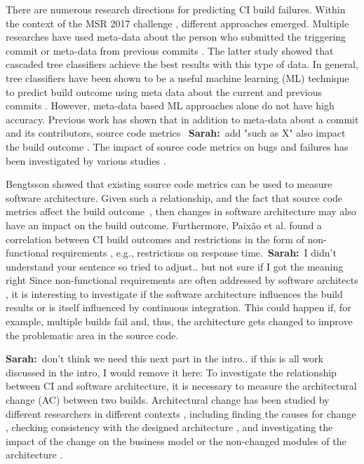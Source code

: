 \documentclass[sigplan, anonymous, review]{acmart}
\newcommand{\sn}[1]{{\color{blue}\textbf{Sarah:}~#1}}
\begin{document}
There are numerous research directions for predicting CI build failures. Within the context of the MSR 2017 challenge \cite{TravisTorrent}, different approaches emerged.
Multiple researches have used meta-data about the person who submitted the triggering commit \cite{ContrInvolv} or meta-data from previous commits \cite{Pred-Cascade}. The latter study showed that cascaded tree classifiers achieve the best results with this type of data. 
In general, tree classifiers have been shown to be a useful machine learning (ML) technique to predict build outcome using meta data about the current and previous commits \cite{Pred-Tree}. 
However, meta-data based ML approaches alone do not have high accuracy.
Previous work has shown that in addition to meta-data about a commit and its contributors, source code metrics ~\sn{add "such as X"} also impact the build outcome \cite{FailsCorr}. The impact of source code metrics on bugs and failures has been investigated by various studies \cite{MetricsSource1, MetricsSource2}. 

Bengtsson \cite{arc-metrics} showed that existing source code metrics can be used to measure software architecture. 
Given such a relationship, and the fact that source code metrics affect the build outcome~\cite{MetricsSource1, MetricsSource2, FailsCorr}, then changes in software architecture may also have an impact on the build outcome.
Furthermore, Paix\~{a}o et al. found a correlation between CI build outcomes and restrictions in the form of non-functional requirements \cite{Fail-NFReq}, e.g., restrictions on response time.~\sn{I didn't understand your sentence so tried to adjust.. but not sure if I got the meaning right}
Since non-functional requirements are often addressed by software architects \cite{NFR-Architects}, it is interesting to investigate if the software architecture influences the build results or is itself influenced by continuous integration. 
This could happen if, for example, multiple builds fail and, thus, the architecture gets changed to improve the problematic area in the source code.

\sn{don't think we need this next part in the intro.. if this is all work discussed in the intro, I would remove it here: To investigate the relationship between CI and software architecture, it is necessary to measure the architectural change (AC) between two builds. Architectural change has been studied by different researchers in different contexts \cite{Aramis,StructDist,Arc-MDSE,Arcade-Base}, including  finding the causes for change \cite{AC-Causes}, checking consistency with the designed architecture \cite{ArcConf, ArcCons}, and investigating the impact of the change on the business model \cite{ArcChange-Business} or the non-changed modules of the architecture \cite{Knowledge-AC}. }
\end{document}
